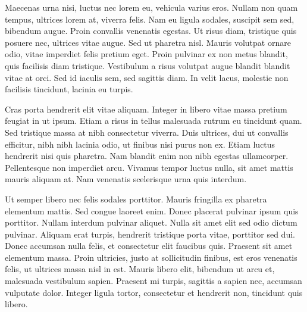 \documentclass{novel}
\begin{document}
Maecenas urna nisi, luctus nec lorem eu, vehicula varius eros. Nullam non quam tempus, ultrices lorem at, viverra felis. Nam eu ligula sodales, suscipit sem sed, bibendum augue. Proin convallis venenatis egestas. Ut risus diam, tristique quis posuere nec, ultrices vitae augue. Sed ut pharetra nisl. Mauris volutpat ornare odio, vitae imperdiet felis pretium eget. Proin pulvinar ex non metus blandit, quis facilisis diam tristique. Vestibulum a risus volutpat augue blandit blandit vitae at orci. Sed id iaculis sem, sed sagittis diam. In velit lacus, molestie non facilisis tincidunt, lacinia eu turpis.

Cras porta hendrerit elit vitae aliquam. Integer in libero vitae massa pretium feugiat in ut ipsum. Etiam a risus in tellus malesuada rutrum eu tincidunt quam. Sed tristique massa at nibh consectetur viverra. Duis ultrices, dui ut convallis efficitur, nibh nibh lacinia odio, ut finibus nisi purus non ex. Etiam luctus hendrerit nisi quis pharetra. Nam blandit enim non nibh egestas ullamcorper. Pellentesque non imperdiet arcu. Vivamus tempor luctus nulla, sit amet mattis mauris aliquam at. Nam venenatis scelerisque urna quis interdum.

Ut semper libero nec felis sodales porttitor. Mauris fringilla ex pharetra elementum mattis. Sed congue laoreet enim. Donec placerat pulvinar ipsum quis porttitor. Nullam interdum pulvinar aliquet. Nulla sit amet elit sed odio dictum pulvinar. Aliquam erat turpis, hendrerit tristique porta vitae, porttitor sed dui. Donec accumsan nulla felis, et consectetur elit faucibus quis. Praesent sit amet elementum massa. Proin ultricies, justo at sollicitudin finibus, est eros venenatis felis, ut ultrices massa nisl in est. Mauris libero elit, bibendum ut arcu et, malesuada vestibulum sapien. Praesent mi turpis, sagittis a sapien nec, accumsan vulputate dolor. Integer ligula tortor, consectetur et hendrerit non, tincidunt quis libero.
\end{document}
